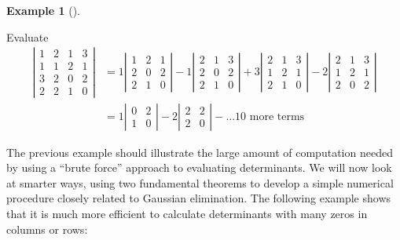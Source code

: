 \documentclass[
  a4paper,
  DIV=11,
  numbers=noendperiod,
  oneside]{scrreprt}
\theoremstyle{definition}
\newtheorem{example}{Example}[chapter]
\theoremstyle{remark}
\begin{document}
\begin{example}[]\protect\hypertarget{exm-det4}{}\label{exm-det4}

Evaluate \[\begin{aligned}
\left| 
\begin{array}{cccc}
1 & 2 & 1 & 3 \\ 
1 & 1 & 2 & 1 \\ 
3 & 2 & 0 & 2 \\ 
2 & 2 & 1 & 0
\end{array}
\right| & = 1\left| 
\begin{array}{ccc} 
 1 & 2 & 1 \\ 
 2 & 0 & 2 \\ 
 2 & 1 & 0
\end{array}
\right| - 1 \left| 
\begin{array}{ccc}
 2 & 1 & 3 \\ 
 2 & 0 & 2 \\ 
 2 & 1 & 0
\end{array}
\right|  + 3 \left| 
\begin{array}{ccc}
 2 & 1 & 3 \\ 
 1 & 2 & 1 \\ 
 2 & 1 & 0
\end{array}
\right| - 2 \left| 
\begin{array}{ccc}
 2 & 1 & 3 \\ 
 1 & 2 & 1 \\ 
 2 & 0 & 2 \end{array}
\right| \\
& = 1\left| 
\begin{array}{cc} 
 0 & 2 \\ 
 1 & 0
\end{array}
\right| -2  \left|\begin{array}{cc} 
 2& 2 \\ 
 2 & 0
\end{array}
\right|  - ... \text{10 more terms} 
\end{aligned}\]

\end{example}

The previous example should illustrate the large amount of computation
needed by using a ``brute force'' approach to evaluating determinants.
We will now look at smarter ways, using two fundamental theorems to
develop a simple numerical procedure closely related to Gaussian
elimination. The following example shows that it is much more efficient
to calculate determinants with many zeros in columns or rows:
\end{document}
